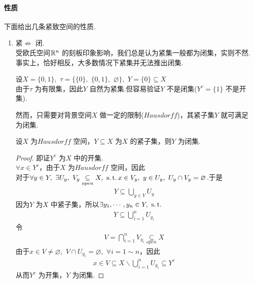 \paragraph{性质}
	下面给出几条紧致空间的性质.
	\begin{enumerate}
		\item 紧$\not\Rightarrow$ 闭.\\
		受欧氏空间$\mathbb{R}^n$ 的刻板印象影响，我们总是认为紧集一般都为闭集，实则不然.事实上，恰好相反，大多数情况下紧集并无法推出闭集.
		\begin{example}\label{ex 2.1.2}
			设$X = \{ 0 , 1 \} , \,\, \tau = \{ \{ 0 \} , \,\, \{ 0 , 1 \} , \,\, \varnothing \} , \,\, Y = \{ 0 \} \subseteq X$\\
			由于$\tau$ 为有限集，因此$Y$ 自然为紧集.但容易验证$Y$ 不是闭集($Y^c = \{ 1 \}$ 不是开集).
		\end{example}
	
		然而，只需要对背景空间$X$ 做一定的限制($Hausdorff$)，其紧子集$Y$ 就可满足为闭集.
		\begin{proposition}\label{prop 2.1.1}
			设$X$ 为$Hausdorff$ 空间，$Y \subseteq X$ 为$X$ 的紧子集，则$Y$ 为闭集.
			\begin{proof}
				即证$Y^c$ 为$X$ 中的开集.\\
				$\forall x \in Y^c$，由于$X$ 为$Hausdorff$ 空间，因此\\
				对于$\forall y \in Y , \,\, \exists U_y , \,\, V_y \underset{open}{\subseteq} X , \,\, \operatorname{s.t.} x \in V_y , \,\, y \in U_y , \,\, U_y \cap V_y = \varnothing$.于是
				\begin{align}
					Y \subseteq \bigcup_{y \in Y}{U_y}
				\end{align}
				因为$Y$ 为$X$ 中紧子集，所以$\exists y_1 , \cdots , y_n \in Y , \,\, \operatorname{s.t.}$
				\begin{align}
					Y \subseteq \bigcup_{i = 1}^{n}{U_{y_i}}
				\end{align}
				令
				\begin{align}
					V = \bigcap_{i = 1}^{n}{V_{y_i}} \underset{open}{\subseteq} X
				\end{align}
				由于$x \in V \neq \varnothing , \,\, V \cap U_{y_i} = \varnothing , \,\, \forall i = 1 \sim n$，因此
				\begin{align}
					x \in V \subseteq X \backslash \bigcup_{i = 1}^{n}{U_{y_i}} \subseteq Y^c
				\end{align}
				从而$Y^c$ 为开集，$Y$ 为闭集.
			\end{proof}
		\end{proposition}
		

\end{enumerate}
